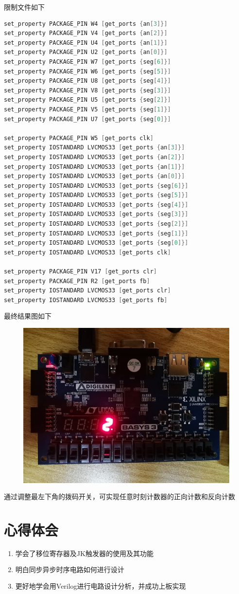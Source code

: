 \documentclass[11pt,UTF8]{ctexart}
\begin{document}
\par 限制文件如下
\begin{lstlisting}[language=Verilog,basicstyle=\tiny]
set_property PACKAGE_PIN W4 [get_ports {an[3]}]
set_property PACKAGE_PIN V4 [get_ports {an[2]}]
set_property PACKAGE_PIN U4 [get_ports {an[1]}]
set_property PACKAGE_PIN U2 [get_ports {an[0]}]
set_property PACKAGE_PIN W7 [get_ports {seg[6]}]
set_property PACKAGE_PIN W6 [get_ports {seg[5]}]
set_property PACKAGE_PIN U8 [get_ports {seg[4]}]
set_property PACKAGE_PIN V8 [get_ports {seg[3]}]
set_property PACKAGE_PIN U5 [get_ports {seg[2]}]
set_property PACKAGE_PIN V5 [get_ports {seg[1]}]
set_property PACKAGE_PIN U7 [get_ports {seg[0]}]

set_property PACKAGE_PIN W5 [get_ports clk]
set_property IOSTANDARD LVCMOS33 [get_ports {an[3]}]
set_property IOSTANDARD LVCMOS33 [get_ports {an[2]}]
set_property IOSTANDARD LVCMOS33 [get_ports {an[1]}]
set_property IOSTANDARD LVCMOS33 [get_ports {an[0]}]
set_property IOSTANDARD LVCMOS33 [get_ports {seg[6]}]
set_property IOSTANDARD LVCMOS33 [get_ports {seg[5]}]
set_property IOSTANDARD LVCMOS33 [get_ports {seg[4]}]
set_property IOSTANDARD LVCMOS33 [get_ports {seg[3]}]
set_property IOSTANDARD LVCMOS33 [get_ports {seg[2]}]
set_property IOSTANDARD LVCMOS33 [get_ports {seg[1]}]
set_property IOSTANDARD LVCMOS33 [get_ports {seg[0]}]
set_property IOSTANDARD LVCMOS33 [get_ports clk]

set_property PACKAGE_PIN V17 [get_ports clr]
set_property PACKAGE_PIN R2 [get_ports fb]
set_property IOSTANDARD LVCMOS33 [get_ports clr]
set_property IOSTANDARD LVCMOS33 [get_ports fb]
\end{lstlisting}
\par 最终结果图如下
\begin{figure}[H]
    \centering
    \includegraphics[width=0.6\linewidth]{fig/basys3_12system.jpg}
\end{figure}
\par 通过调整最左下角的拨码开关，可实现任意时刻计数器的正向计数和反向计数


\section{心得体会}
\begin{enumerate}
    \item 学会了移位寄存器及JK触发器的使用及其功能
    \item 明白同步异步时序电路如何进行设计
    \item 更好地学会用Verilog进行电路设计分析，并成功上板实现
\end{enumerate}
\end{document}
